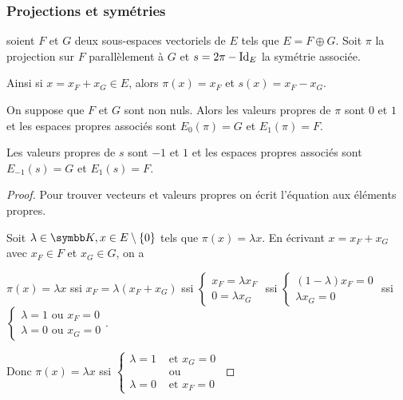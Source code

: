 \subsubsection{Projections et symétries}

\begin{exemple}
    soient $F$ et $G$ deux sous-espaces vectoriels de $E$ tels que $E = F \oplus G$.
    Soit $\pi$ la projection sur $F$ parallèlement à $G$ et $s = 2 \pi - \operatorname{Id}_E$ la symétrie associée. 

    Ainsi si $x = x_F + x_G \in E$, alors $\pi(x) = x_F$ et $s(x) = x_F - x_G$.

    On suppose que $F$ et $G$ sont non nuls. Alors les valeurs propres de $\pi$ sont $0$ et $1$ 
    et les espaces propres associés sont $E_0(\pi) = G$ et $E_1(\pi) = F$.

    Les valeurs propres de $s$ sont $-1$ et $1$ et les espaces propres associés sont 
    $E_{-1}(s) = G$ et $E_1(s) = F$.


    \begin{proof} 
        Pour trouver vecteurs et valeurs propres on écrit l'équation aux éléments propres.

        Soit $\lambda \in \K, x \in E \setminus \{0\}$ tels que $\pi(x) = \lambda x$.
        En écrivant $x = x_F + x_G$ avec $x_F \in F$ et $x_G \in G$, on a
        
        $\pi(x) = \lambda x $ ssi $x_F = \lambda (x_F + x_G)$ ssi $\begin{cases}
        x_F = \lambda x_F \\
        0 = \lambda x_G
        \end{cases}$ ssi $\begin{cases}
        (1 - \lambda) x_F = 0 \\
        \lambda x_G = 0
        \end{cases}$ ssi $\begin{cases}
            \lambda = 1 \text{ ou } x_F = 0 \\
            \lambda = 0 \text{ ou } x_G = 0
        \end{cases}$.

        Donc $\pi(x) = \lambda x$ ssi $\begin{cases}
            \lambda = 1 &\text{ et } x_G = 0 \\
            & \text{ ou } \\
            \lambda = 0 &\text{ et } x_F = 0
        \end{cases}$


\end{proof}
\end{exemple}
